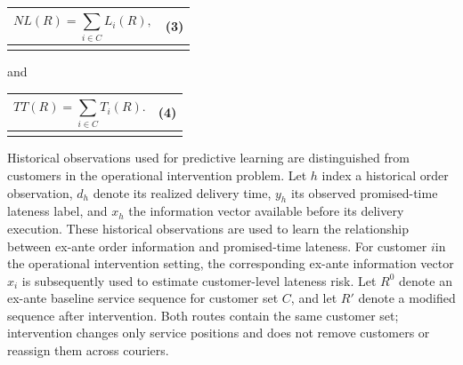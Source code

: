 \documentclass[
]{article}
\newcounter{none} %
\begin{document}
{\def\LTcaptype{none} %
\begin{longtable}[]{@{}
  >{\raggedright\arraybackslash}p{}
  >{\raggedright\arraybackslash}p{}@{}}
\toprule\noalign{}
\begin{minipage}[b]{\linewidth}\raggedright
\[NL(R) = \sum_{i \in C}^{}L_{i}(R),\]
\end{minipage} & \begin{minipage}[b]{\linewidth}\raggedleft
(3)
\end{minipage} \\
\midrule\noalign{}
\endhead
\bottomrule\noalign{}
\endlastfoot
\end{longtable}
}

and

{\def\LTcaptype{none} %
\begin{longtable}[]{@{}
  >{\raggedright\arraybackslash}p{}
  >{\raggedright\arraybackslash}p{}@{}}
\toprule\noalign{}
\begin{minipage}[b]{\linewidth}\raggedright
\[TT(R) = \sum_{i \in C}^{}T_{i}(R).\]
\end{minipage} & \begin{minipage}[b]{\linewidth}\raggedleft
(4)
\end{minipage} \\
\midrule\noalign{}
\endhead
\bottomrule\noalign{}
\endlastfoot
\end{longtable}
}

Historical observations used for predictive learning are distinguished
from customers in the operational intervention problem. Let \(h\) index
a historical order observation, \(d_{h}\) denote its realized delivery
time, \(y_{h}\) its observed promised-time lateness label, and \(x_{h}\)
the information vector available before its delivery execution. These
historical observations are used to learn the relationship between
ex-ante order information and promised-time lateness. For customer
\(i\)in the operational intervention setting, the corresponding ex-ante
information vector \(x_{i}\) is subsequently used to estimate
customer-level lateness risk. Let \(R^{0}\) denote an ex-ante baseline
service sequence for customer set \(C\), and let \(R'\) denote a
modified sequence after intervention. Both routes contain the same
customer set; intervention changes only service positions and does not
remove customers or reassign them across couriers.
\end{document}
